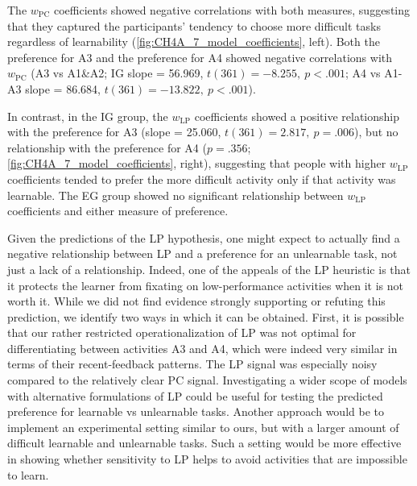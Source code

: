 \begin{subappendices}
The $w_\mathrm{PC}$ coefficients showed negative correlations with both measures, suggesting that they captured the participants’ tendency to choose more difficult tasks regardless of learnability (\cref{fig:CH4A_7_model_coefficients}, left). Both the preference for A3 and the preference for A4 showed negative correlations with $w_\mathrm{PC}$ (A3 vs A1\&A2; \ac{IG} slope = 56.969, $t(361) = -8.255,\ p < .001$; A4 vs A1-A3 slope = 86.684, $t(361) = -13.822,\ p < .001$).

In contrast, in the \ac{IG} group, the $w_\mathrm{LP}$ coefficients showed a positive relationship with the preference for A3 (slope = 25.060, $t(361) = 2.817,\ p = .006$), but no relationship with the preference for A4 ($p = .356$; \cref{fig:CH4A_7_model_coefficients}, right), suggesting that people with higher $w_\mathrm{LP}$ coefficients tended to prefer the more difficult activity only if that activity was learnable. The \ac{EG} group showed no significant relationship between $w_\mathrm{LP}$ coefficients and either measure of preference. 
        
Given the predictions of the \ac{LP} hypothesis, one might expect to actually find a negative relationship between \ac{LP} and a preference for an unlearnable task, not just a lack of a relationship. Indeed, one of the appeals of the \ac{LP} heuristic is that it protects the learner from fixating on low-performance activities when it is not worth it. While we did not find evidence strongly supporting or refuting this prediction, we identify two ways in which it can be obtained. First, it is possible that our rather restricted operationalization of \ac{LP} was not optimal for differentiating between activities A3 and A4, which were indeed very similar in terms of their recent-feedback patterns. The \ac{LP} signal was especially noisy compared to the relatively clear \ac{PC} signal. Investigating a wider scope of models with alternative formulations of \ac{LP} could be useful for testing the predicted preference for learnable vs unlearnable tasks. Another approach would be to implement an experimental setting similar to ours, but with a larger amount of difficult learnable and unlearnable tasks. Such a setting would be more effective in showing whether sensitivity to \ac{LP} helps to avoid activities that are impossible to learn.

\end{subappendices}